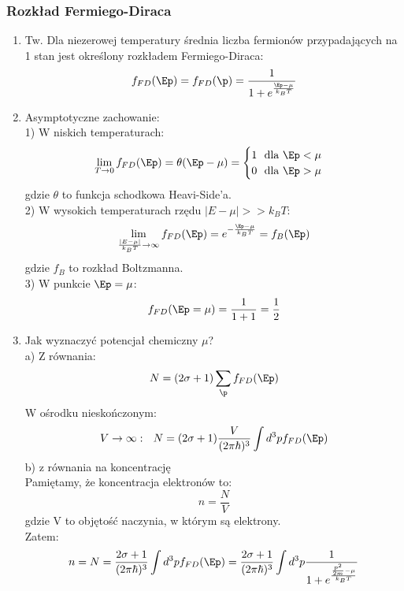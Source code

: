 \subsubsection{Rozkład Fermiego-Diraca}
\begin{enumerate}
\item Tw. Dla niezerowej temperatury średnia liczba fermionów przypadających na 1 stan jest określony rozkładem Fermiego-Diraca:
\begin{equation} f_{FD}(\Ep)=f_{FD}(\p)=\frac{1}{1+e^{\frac{\Ep-\mu}{k_BT}}}\end{equation}
\item Asymptotyczne zachowanie:\\
1) W niskich temperaturach:
\begin{equation}\lim\limits_{T \to 0}f_{FD}(\Ep)=\theta(\Ep-\mu)= \begin{cases} 1~~\text{dla}~\Ep< \mu \\ 0~~\text{dla}~\Ep>\mu\end{cases}\end{equation}
gdzie $\theta$ to funkcja schodkowa Heavi-Side'a.\\
2) W wysokich temperaturach rzędu $|E-\mu|>>k_BT$:
\begin{equation}\lim\limits_{\frac{|E-\mu|}{k_BT}\rightarrow\infty} f_{FD}(\Ep)=e^{-\frac{\Ep-\mu}{k_BT}}=f_B(\Ep)\end{equation}
gdzie $f_B$ to rozkład Boltzmanna.\\
3) W punkcie $\Ep=\mu$:
\begin{equation}f_{FD}(\Ep=\mu)=\frac{1}{1+1}=\frac{1}{2}\end{equation}
\item Jak wyznaczyć potencjał chemiczny $\mu$?\\
a) Z równania:
\begin{equation} N=(2\sigma+1)\sum_{\p}f_{FD}(\Ep)\end{equation}
W ośrodku nieskończonym:
\begin{equation}V\rightarrow\infty:~~N=(2\sigma+1)\frac{V}{(2\pi\hbar)^3}\int d^3p f_{FD}(\Ep)\end{equation}
b) z równania na koncentrację\\
Pamiętamy, że koncentracja elektronów to:
\begin{equation}n=\frac{N}{V}\end{equation}
gdzie V to objętość naczynia, w którym są elektrony.\\
Zatem:
\begin{equation}n=N=\frac{2\sigma+1}{(2\pi\hbar)^3}\int d^3p f_{FD}(\Ep)=\frac{2\sigma+1}{(2\pi\hbar)^3}\int d^3p \frac{1}{1+e^{\frac{\frac{p^2}{2m}-\mu}{k_BT}}}\end{equation}

\end{enumerate}
